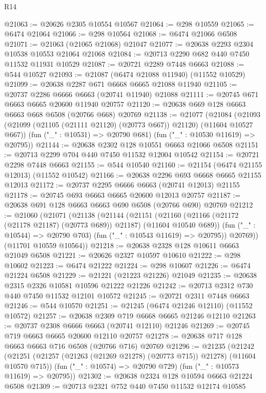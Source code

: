 \begin{lexlean}{R14}
\begin{coremodule}
@21063 := @20626 @2305 @10554 @10567
@21064 := @298 @10559
@21065 := @6474 @21064
@21066 := @298 @10564
@21068 := @6474 @21066 @6508
@21071 := @21063 (@21065 @21068) @21047
@21077 := @20638 @2293 @2304 @10538 @10553 @21064 @21068
@21084 := @20713 @2290 @682 @440 @7450 @11532 @11931 @10529
@21087 := @20721 @2289 @7448 @6663
@21088 := @544 @10527
@21093 := @21087 (@6474 @21088 @11940) (@11552 @10529)
@21099 := @20638 @2287 @671 @6668 @6665 @21088 @11940
@21105 := @20737 @2286 @6666 @6663 (@20741 @11940) @21088
@21111 := @20745 @671 @6663 @6665 @20600 @11940 @20757
@21120 := @20638 @669 @128 @6663 @6663 @668 @6508 (@20766 @668) @20769
@21138 := @21077
    (@21084
      (@21093 (@21099 (@21105 (@21111 @21120) (@20773 @667)) @21120) (@11604 @10527 @667))
      (fun ("_" : @10531) => @20790 @681)
      (fun ("_" : @10530 @11619) => @20795))
@21144 := @20638 @2302 @128 @10551 @6663 @21066 @6508
@21151 := @20713 @2299 @704 @440 @7450 @11532 @12004 @10542
@21154 := @20721 @2298 @7448 @6663
@21155 := @544 @10540
@21160 := @21154 (@6474 @21155 @12013) (@11552 @10542)
@21166 := @20638 @2296 @693 @6668 @6665 @21155 @12013
@21172 := @20737 @2295 @6666 @6663 (@20741 @12013) @21155
@21178 := @20745 @693 @6663 @6665 @20600 @12013 @20757
@21187 := @20638 @691 @128 @6663 @6663 @690 @6508 (@20766 @690) @20769
@21212 := @21060
    (@21071
      (@21138
        (@21144
          (@21151
            (@21160 (@21166 (@21172 (@21178 @21187) (@20773 @689)) @21187) (@11604 @10540 @689))
            (fun ("_" : @10544) => @20790 @703)
            (fun ("_" : @10543 @11619) => @20795))
          @20769))
      (@11701 @10559 @10564))
@21218 := @20638 @2328 @128 @10611 @6663 @21049 @6508
@21221 := @20626 @2327 @10597 @10610
@21222 := @298 @10602
@21223 := @6474 @21222
@21224 := @298 @10607
@21226 := @6474 @21224 @6508
@21229 := @21221 (@21223 @21226) @21049
@21235 := @20638 @2315 @2326 @10581 @10596 @21222 @21226
@21242 := @20713 @2312 @730 @440 @7450 @11532 @12101 @10572
@21245 := @20721 @2311 @7448 @6663
@21246 := @544 @10570
@21251 := @21245 (@6474 @21246 @12110) (@11552 @10572)
@21257 := @20638 @2309 @719 @6668 @6665 @21246 @12110
@21263 := @20737 @2308 @6666 @6663 (@20741 @12110) @21246
@21269 := @20745 @719 @6663 @6665 @20600 @12110 @20757
@21278 := @20638 @717 @128 @6663 @6663 @716 @6508 (@20766 @716) @20769
@21296 := @21235
    (@21242
      (@21251 (@21257 (@21263 (@21269 @21278) (@20773 @715)) @21278) (@11604 @10570 @715))
      (fun ("_" : @10574) => @20790 @729)
      (fun ("_" : @10573 @11619) => @20795))
@21302 := @20638 @2324 @128 @10594 @6663 @21224 @6508
@21309 := @20713 @2321 @752 @440 @7450 @11532 @12174 @10585

\end{coremodule}
\end{lexlean}
